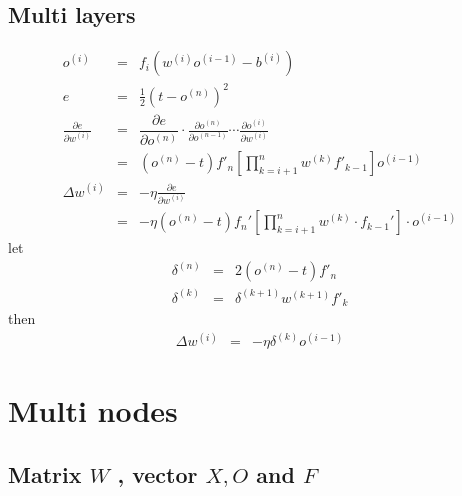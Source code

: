\documentclass{article}
\newcommand{\cdummy}{\cdot}
\begin{document}
\subsection{Multi layers}

\begin{eqnarray*}
  o^{( i )} & = & f_{i} ( w^{( i )} o^{( i-1 )} -b_{}^{( i )} )\\
  e & = & \frac{1}{2} ( t-o^{( n )} )^{2}\\
  \frac{\partial e}{\partial w^{( i )}} & = & \dfrac{\partial e}{\partial o^{(
  n )}} \cdummy \frac{\partial o^{( n )}}{\partial o^{( n-1 )}} \cdots
  \frac{\partial o^{( i )}}{\partial w^{( i )}}\\
  & = & ( o^{( n )} -t ) f'_{n} \left[ \prod_{k=i+1}^{n} w^{( k )} f'_{k-1}
  \right] o^{( i-1 )}\\
  \Delta w^{( i )} & = & - \eta \frac{\partial e}{\partial w^{( i )}}\\
  & = & - \eta ( o^{( n )} -t ) f_{n}' \left[ \prod_{k=i+1}^{n} w^{( k )}
  \cdummy f_{k-1}' \right] \cdummy o^{( i-1 )}
\end{eqnarray*}
let
\begin{eqnarray*}
  \delta^{( n )} & = & 2 ( o^{( n )} -t ) f'_{n}\\
  \delta^{( k )} & = & \delta^{( k+1 )} w^{( k+1 )} f'_{k}
\end{eqnarray*}
then
\begin{eqnarray*}
  \Delta w^{( i )} & = & - \eta \delta^{( k )} o^{( i-1 )}
\end{eqnarray*}

\section{Multi nodes}

\subsection{Matrix $W$ , vector $X,O$ and $F$}
\end{document}

